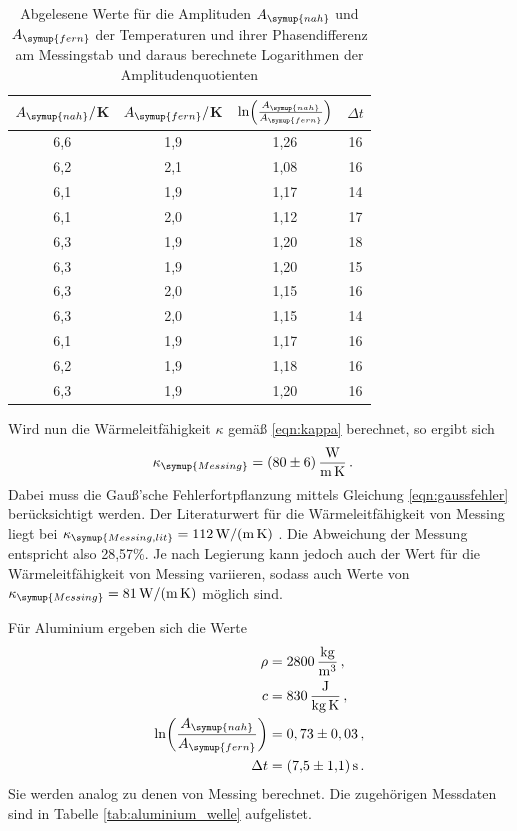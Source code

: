 \begin{table}
  \centering
  \caption{Abgelesene Werte für die Amplituden $A_{\symup{nah}}$ und $A_{\symup{fern}}$ der Temperaturen und
  ihrer Phasendifferenz am Messingstab und daraus berechnete Logarithmen der Amplitudenquotienten}
  \label{tab:messing_welle}
  \begin{tabular}{c c c c}
    \toprule
     $A_{\symup{nah}}/$K  & $A_{\symup{fern}}/$K & $\ln\Bigl(\frac{A_{\symup{nah}}}{A_{\symup{fern}}}\Bigr)$ & $\Delta t$ \\
    \midrule
    6,6 & 1,9 & 1,26  & 16  \\
    6,2 & 2,1 & 1,08  & 16  \\
    6,1 & 1,9 & 1,17  & 14  \\
    6,1 & 2,0 & 1,12  & 17  \\
    6,3 & 1,9 & 1,20  & 18  \\
    6,3 & 1,9 & 1,20  & 15  \\
    6,3 & 2,0 & 1,15  & 16  \\
    6,3 & 2,0 & 1,15  & 14  \\
    6,1 & 1,9 & 1,17  & 16  \\
    6,2 & 1,9 & 1,18  & 16  \\
    6,3 & 1,9 & 1,20  & 16  \\
    \bottomrule
  \end{tabular}
\end{table}

Wird nun die Wärmeleitfähigkeit $\kappa$ gemäß \eqref{eqn:kappa} berechnet, so ergibt sich
\begin{align}
  \kappa_{\symup{Messing}} &= \SI{80(6)}{\watt\per\meter\per\kelvin}\,.\nonumber
\end{align}
Dabei muss die Gauß'sche Fehlerfortpflanzung mittels Gleichung \eqref{eqn:gaussfehler}
berücksichtigt werden.
Der Literaturwert für die Wärmeleitfähigkeit von Messing liegt bei
$\kappa_{\symup{Messing,lit}}=\SI{112}{\watt\per\meter\per\kelvin}$ \cite{Wärmeleitfähigkeit1}.
Die Abweichung der Messung entspricht also 28,57\%. Je nach Legierung kann
jedoch auch der Wert für die Wärmeleitfähigkeit von Messing variieren, sodass auch Werte von
$\kappa_{\symup{Messing}} = \SI{81}{\watt\per\meter\per\kelvin}$ \cite{Wärmeleitfähigkeit2}
möglich sind.




Für Aluminium ergeben sich die Werte
\begin{align}
  \rho &= \SI{2800}{\kilo\gram\per\cubic\meter}\,, \nonumber\\
  c &= \SI{830}{\joule\per\kilo\gram\per\kelvin}\,, \nonumber\\
  \ln\biggl(\frac{A_{\symup{nah}}}{A_{\symup{fern}}}\biggr) &= 0,73 \pm 0,03 \,, \nonumber\\
  \Delta t &= \SI{7.5(11)}{\second} \,.\nonumber
\end{align}
Sie werden analog zu denen von Messing berechnet. Die zugehörigen Messdaten sind
in Tabelle \ref{tab:aluminium_welle} aufgelistet.

